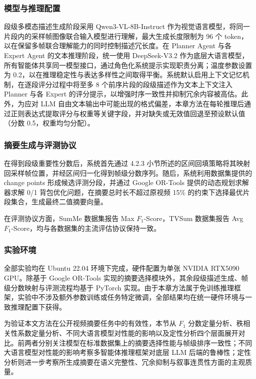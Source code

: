 \subsubsection{模型与推理配置}
段级多模态描述生成阶段采用 Qwen3-VL-8B-Instruct 作为视觉语言模型，将同一片段内的采样帧图像联合输入模型进行理解，最大生成长度限制为 96 个 token，以在保留多帧联合理解能力的同时控制描述冗长度。在 Planner Agent 与各 Expert Agent 的文本推理阶段，统一使用 DeepSeek-V3.2 作为底层大语言模型，所有智能体共享同一模型接口，通过角色化系统提示实现职责分离；温度参数设置为 0.2，以在推理稳定性与表达多样性之间取得平衡。系统默认启用上下文记忆机制，在逐段评分过程中将至多 8 个前序片段的段级描述作为文本上下文注入 Planner 与各 Expert 的评分提示，以增强时序一致性并抑制冗余内容被高估。此外，为应对 LLM 自由文本输出中可能出现的格式偏差，本章方法在每轮推理后通过正则表达式提取评分与权重等关键字段，并对缺失或无效值回退至预设默认值（分数 0.5，权重均匀分配）。

\subsubsection{摘要生成与评测协议}
在得到段级重要性分数后，系统首先通过 4.2.3 小节所述的区间回填策略将其映射回采样帧位置，并经区间归一化得到帧级分数序列。随后，系统利用数据集提供的 change points 形成候选评测分段，并通过 Google OR-Tools 提供的动态规划求解器求解 0/1 背包优化问题，在摘要总时长不超过原视频 15\% 的约束下选择最优片段集合，生成最终二值摘要向量。

在评测协议方面，SumMe 数据集报告 Max $F_1$-Score，TVSum 数据集报告 Avg $F_1$-Score，均与各数据集的主流评估协议保持一致。

\subsubsection{实验环境}
全部实验均在 Ubuntu 22.04 环境下完成，硬件配置为单张 NVIDIA RTX5090 GPU。除基于 Google OR-Tools 实现的摘要选择模块外，其余段级描述生成、帧级分数映射与评测流程均基于 PyTorch 实现。由于本章方法属于免训练推理框架，实验中不涉及额外参数训练或任务特定微调，全部结果均在统一硬件环境与一致推理配置下获得。

为验证本文方法在公开视频摘要任务中的有效性，本节从 $F_1$ 分数定量分析、秩相关性系数定量分析、不同大语言模型对性能的影响以及定性分析四个层面展开对比。前两者分别关注模型在标准数据集上的摘要选择性能与帧级排序一致性；不同大语言模型对性能的影响考察多智能体推理框架对底层 LLM 后端的鲁棒性；定性分析则进一步考察所生成摘要在语义完整性、冗余抑制与叙事连贯性方面的主观质量。

